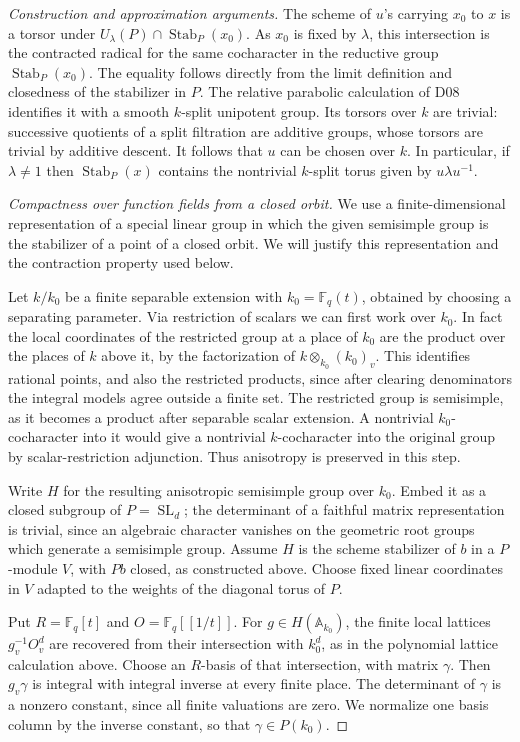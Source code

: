 \documentclass[11pt,a4paper,openany,oneside]{book}
\theoremstyle{resultstyle}
\theoremstyle{definition}
\numberwithin{equation}{chapter}
\begin{document}
\begin{proof}[Construction and approximation arguments]
The scheme of \(u\)'s carrying \(x_0\) to \(x\) is a
torsor under \(U_\lambda(P)\cap\operatorname{Stab}_P(x_0)\).
As \(x_0\) is fixed by \(\lambda\), this intersection is the
contracted radical for the same cocharacter in the
reductive group \(\operatorname{Stab}_P(x_0)\). The equality
follows directly from the limit definition and closedness of
the stabilizer in \(P\). The relative parabolic calculation
of D08 identifies it with a smooth \(k\)-split unipotent
group. Its torsors over \(k\) are trivial: successive quotients
of a split filtration are additive groups, whose torsors are
trivial by additive descent. It follows that \(u\) can be
chosen over \(k\). In particular, if \(\lambda\ne1\) then
\(\operatorname{Stab}_P(x)\) contains the nontrivial
\(k\)-split torus given by \(u\lambda u^{-1}\).

\medskip\noindent
\textit{Compactness over function fields from a closed orbit.}
We use a finite-dimensional representation of a special linear
group in which the given semisimple group is the stabilizer of
a point of a closed orbit. We will justify this representation
and the contraction property used below.

Let \(k/k_0\) be a finite separable extension with
\(k_0=\mathbb F_q(t)\), obtained by choosing a separating
parameter. Via restriction of scalars we can first work over
\(k_0\). In fact the local coordinates of the restricted group at
a place of \(k_0\) are the product over the places of \(k\) above
it, by the factorization of \(k\otimes_{k_0}(k_0)_v\).
This identifies rational points, and also the restricted products,
since after clearing denominators the integral models agree
outside a finite set. The restricted group is semisimple, as it
becomes a product after separable scalar extension. A nontrivial
\(k_0\)-cocharacter into it would give a nontrivial
\(k\)-cocharacter into the original group by scalar-restriction
adjunction. Thus anisotropy is preserved in this step.

Write \(H\) for the resulting anisotropic semisimple group over
\(k_0\). Embed it as a closed subgroup of \(P=\operatorname{SL}_d\);
the determinant of a faithful matrix representation is trivial,
since an algebraic character vanishes on the geometric root
groups which generate a semisimple group. Assume \(H\) is the
scheme stabilizer of \(b\) in a \(P\)-module \(V\), with \(P b\)
closed, as constructed above. Choose fixed linear coordinates
in \(V\) adapted to the weights of the diagonal torus of \(P\).

Put \(R=\mathbb F_q[t]\) and \(O=\mathbb F_q[[1/t]]\). For
\(g\in H(\mathbb A_{k_0})\), the finite local lattices
\(g_v^{-1}O_v^d\) are recovered from their intersection with
\(k_0^d\), as in the polynomial lattice calculation above.
Choose an \(R\)-basis of that intersection, with matrix
\(\gamma\). Then \(g_v\gamma\) is integral with integral inverse
at every finite place. The determinant of \(\gamma\) is a
nonzero constant, since all finite valuations are zero. We
normalize one basis column by the inverse constant, so that
\(\gamma\in P(k_0)\).


\end{proof}
\end{document}
